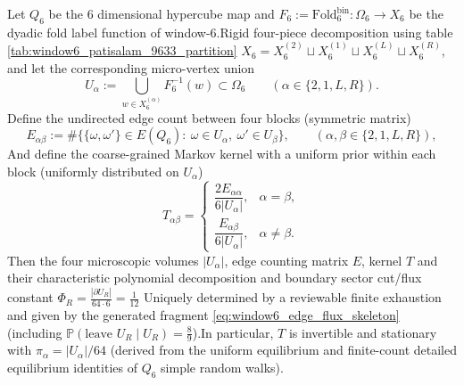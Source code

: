 \begin{enumerate}
\begin{theorem}\label{thm:terminal-window6-edge-flux-skeleton}Let \(Q_6\) be the \(6\) dimensional hypercube map and \(F_6:=\mathrm{Fold}^{\mathrm{bin}}_6:\Omega_6\to X_6\) be the dyadic fold label function of window-\(6\).Rigid four-piece decomposition using table \ref{tab:window6_patisalam_9633_partition}  \(
  X_6=X^{(2)}_6\sqcup X^{(1)}_6\sqcup X^{(L)}_6\sqcup X^{(R)}_6
\), and let the corresponding micro-vertex union  \[
  U_\alpha:=\bigcup_{w\in X^{(\alpha)}_6}F_6^{-1}(w)\subset \Omega_6
  \qquad (\alpha\in\{2,1,L,R\}).
  \]
Define the undirected edge count between four blocks (symmetric matrix)  \[
  E_{\alpha\beta}
  :=\#\bigl\{\{\omega,\omega'\}\in E(Q_6):\ \omega\in U_\alpha,\ \omega'\in U_\beta\bigr\},
  \qquad (\alpha,\beta\in\{2,1,L,R\}),
  \]
And define the coarse-grained Markov kernel with a uniform prior within each block (uniformly distributed on \(U_\alpha\))  \[
  T_{\alpha\beta}=
  \begin{cases}
    \dfrac{2E_{\alpha\alpha}}{6|U_\alpha|}, & \alpha=\beta,\\[6pt]
    \dfrac{E_{\alpha\beta}}{6|U_\alpha|}, & \alpha\neq\beta.
  \end{cases}
  \]
Then the four microscopic volumes \(|U_\alpha|\), edge counting matrix \(E\), kernel \(T\) and their characteristic polynomial decomposition and boundary sector cut/flux constant  \(\Phi_R=\frac{|\partial U_R|}{64\cdot 6}=\frac{1}{12}\)
Uniquely determined by a reviewable finite exhaustion and given by the generated fragment \eqref{eq:window6_edge_flux_skeleton} (including \(\mathbb{P}(\text{leave }U_R\mid U_R)=\frac{8}{9}\)).In particular, \(T\) is invertible and stationary with \(\pi_\alpha=|U_\alpha|/64\) (derived from the uniform equilibrium and finite-count detailed equilibrium identities of \(Q_6\) simple random walks).  \end{theorem}
  
  


\end{enumerate}
